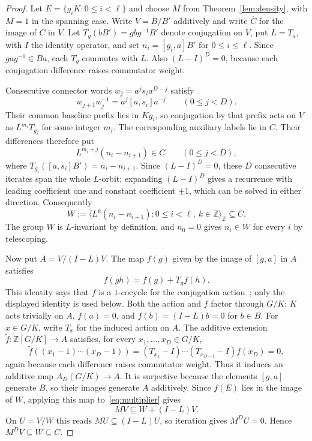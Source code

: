 \documentclass[11pt,a4paper,reqno]{amsart}
\theoremstyle{definition}
\theoremstyle{remark}
\numberwithin{equation}{section}
\newcommand{\Z}{\mathbb Z}
\newcommand{\spanZ}[1]{\langle #1\rangle_{\Z}}
\begin{document}
\begin{proof}
Let $E=\{g_iK:0\le i<\ell\}$ and choose $M$ from Theorem~\ref{lem:density}, with $M=1$ in the spanning case. Write $V=B/B'$ additively and write $\overline C$ for the image of $C$ in $V$. Let $T_g(bB')=gbg^{-1}B'$ denote conjugation on $V$, put $L=T_a$, with $I$ the identity operator, and set $n_i=[g_i,a]B'$ for $0\le i\le\ell$. Since $gag^{-1}\in Ba$, each $T_g$ commutes with $L$. Also $(L-I)^D=0$, because each conjugation difference raises commutator weight.

Consecutive connector words $w_j=a^js_i a^{D-j}$ satisfy
\begin{equation}\label{eq:reordering}
 w_{j+1}w_j^{-1}=a^j[a,s_i]a^{-j}
 \qquad(0\le j<D).
\end{equation}
Their common baseline prefix lies in $Kg_i$, so conjugation by that prefix acts on $V$ as $L^{m_i}T_{g_i}$ for some integer $m_i$. The corresponding auxiliary labels lie in $C$. Their differences therefore put
\[
 L^{m_i+j}(n_i-n_{i+1})\in\overline C\qquad(0\le j<D),
\]
where $T_{g_i}([a,s_i]B')=n_i-n_{i+1}$. Since $(L-I)^D=0$, these $D$ consecutive iterates span the whole $L$-orbit: expanding $(L-I)^D$ gives a recurrence with leading coefficient one and constant coefficient $\pm1$, which can be solved in either direction. Consequently
\[
 W:=\spanZ{L^k(n_i-n_{i+1}):0\le i<\ell,\ k\in\Z}
 \subseteq\overline C.
\]
The group $W$ is $L$-invariant by definition, and $n_0=0$ gives $n_i\in W$ for every $i$ by telescoping.

Now put $A=V/(I-L)V$. The map $f(g)$ given by the image of $[g,a]$ in $A$ satisfies
\begin{equation}\label{eq:commutator-cocycle}
 f(gh)=f(g)+T_gf(h).
\end{equation}
This identity says that $f$ is a $1$-cocycle for the conjugation action~\cite[Chapter IV]{Brown}; only the displayed identity is used below. Both the action and $f$ factor through $G/K$: $K$ acts trivially on $A$, $f(a)=0$, and $f(b)=(I-L)b=0$ for $b\in B$. For $x\in G/K$, write $T_x$ for the induced action on $A$. The additive extension $\widetilde f:\Z[G/K]\to A$ satisfies, for every $x_1,\ldots,x_D\in G/K$,
\begin{equation}\label{eq:cocycle-differences}
 \widetilde f((x_1-1)\cdots(x_D-1))
 =(T_{x_1}-I)\cdots(T_{x_{D-1}}-I)f(x_D)=0,
\end{equation}
again because each difference raises commutator weight. Thus it induces an additive map $A_D(G/K)\to A$. It is surjective because the elements $[g,a]$ generate $B$, so their images generate $A$ additively. Since $f(E)$ lies in the image of $W$, applying this map to~\eqref{eq:multiplier} gives
\[
 MV\subseteq W+(I-L)V.
\]
On $U=V/W$ this reads $MU\subseteq(I-L)U$, so iteration gives $M^DU=0$. Hence $M^DV\subseteq W\subseteq\overline C$.


\end{proof}
\end{document}
